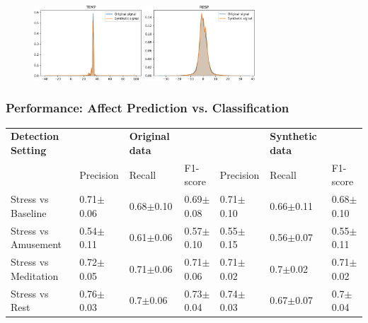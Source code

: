 \documentclass[unknownkeysallowed]{beamer}
\begin{document}
\begin{frame}
\begin{figure}
  \includegraphics[width=.24\textwidth, height=2.8cm]{figs/dist_stress_Temp_acii2019_pres.png}\hfill
  \includegraphics[width=.24\textwidth, height=2.8cm]{figs/dist_stress_Resp_acii2019_pres.png}\hfill

  \label{dist_plt}
\end{figure}

\end{frame}



\begin{frame}
\frametitle{Performance: Affect Prediction vs. Classification}


\begin{table}
    \tiny
	\renewcommand{\arraystretch}{1.3}
	\label{table:classOrigSynth}
	
	\label{cls_perf}
	\centering
	\begin{tabular}{lllllll}
	    \hline
	    \bfseries Detection Setting & & \bfseries Original data & &  & \bfseries Synthetic data & \\
		 & Precision  & Recall  & F1-score & Precision  & Recall  & F1-score \\
        \hline
		Stress vs Baseline  &   0.71$\pm$0.06   &  0.68$\pm$0.10 &   0.69$\pm$0.08   & 0.71$\pm$0.10  & 0.66$\pm$0.11 & 0.68$\pm$0.10 \\
		\pause Stress vs Amusement  &   0.54$\pm$0.11   &  0.61$\pm$0.06 &   0.57$\pm$0.10   & 0.55$\pm$0.15  & 0.56$\pm$0.07 & 0.55$\pm$0.11 \\
		\pause Stress vs Meditation &   0.72$\pm$0.05   &  0.71$\pm$0.06 &   0.71$\pm$0.06   & 0.71$\pm$0.02  & 0.7$\pm$0.02 & 0.71$\pm$0.02 \\
		\pause Stress vs Rest &   0.76$\pm$0.03   &  0.7$\pm$0.06 &   0.73$\pm$0.04   & 0.74$\pm$0.03  & 0.67$\pm$0.07 & 0.7$\pm$0.04 \\
		\hline
	\end{tabular}
\end{table}


\end{frame}
\end{document}

